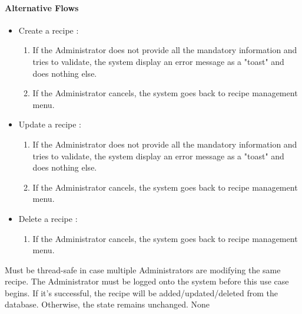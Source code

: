{  \paragraph{Alternative Flows}
  \begin{itemize}
    \item Create a recipe :
    \begin{enumerate}
      \item If the Administrator does not provide all the mandatory information and tries to validate, the system display an error message as a "toast" and does nothing else.
      \item If the Administrator cancels, the system goes back to recipe management menu.
    \end{enumerate}
    \item Update a recipe :
    \begin{enumerate}
      \item If the Administrator does not provide all the mandatory information and tries to validate, the system display an error message as a "toast" and does nothing else.
      \item If the Administrator cancels, the system goes back to recipe management menu.
    \end{enumerate}
    \item Delete a recipe :
    \begin{enumerate}
      \item If the Administrator cancels, the system goes back to recipe management menu.
    \end{enumerate}
  \end{itemize}
}
{Must be thread-safe in case multiple Administrators are modifying the same recipe.}
{The Administrator must be logged onto the system before this use case begins.}
{If it's successful, the recipe will be added/updated/deleted from the database. Otherwise, the state remains unchanged.}
{None}